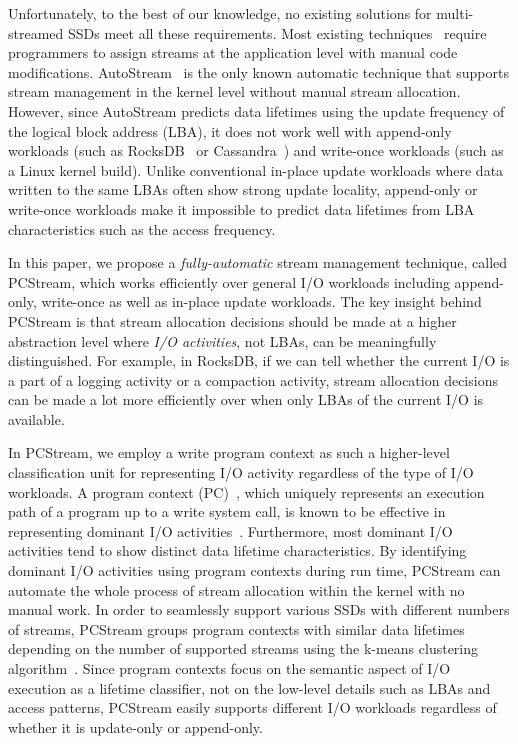 Unfortunately, to the best of our knowledge, no existing solutions  for
multi-streamed SSDs meet all these requirements.  Most existing
techniques~\cite{MultiStream, Level, vStream, FStream} require programmers to
assign streams at the application level with manual code modifications.
\textsf{\small AutoStream}~\cite{AutoStream} is the only known automatic
technique that supports stream management in the kernel level without manual
stream allocation.  However, since \textsf{\small AutoStream} predicts data
lifetimes using the update frequency of the logical block address (LBA), it
does not work well with append-only workloads (such as
RocksDB~\cite{RocksDB} or Cassandra~\cite{Cassandra})
and write-once workloads (such as a Linux kernel build).  Unlike conventional
in-place update workloads where data written to the same LBAs often show strong update
locality, append-only or write-once workloads make it impossible to predict data lifetimes
from LBA characteristics such as the access frequency.

In this paper, we propose a {\it fully-automatic} stream management technique,
called \textsf{\small PCStream}, which works efficiently over general I/O
workloads including append-only, write-once as well as in-place update workloads.   
The key insight behind
\textsf{\small PCStream} is that stream allocation decisions should be made at
a higher abstraction level where {\it I/O activities}, not LBAs, can be
meaningfully distinguished.  For example, in RocksDB, if we can tell whether
the current I/O is a part of a logging activity or a compaction activity, stream
allocation decisions can be made a lot more efficiently over when only LBAs of
the current I/O is available.   

In \textsf{\small PCStream}, we employ a write program context as such a higher-level
classification unit for representing I/O activity regardless of the type of I/O
workloads.  A program context (PC)~\cite{PC, PC2}, which uniquely represents an
execution path of a program up to a write system call, is known to be effective
in representing dominant I/O activities~\cite{PCHa}.  Furthermore, most
dominant I/O activities tend to show distinct data lifetime characteristics.
By identifying dominant I/O activities using program contexts during run time,
\textsf{\small PCStream} can automate the whole process of stream allocation
within the kernel with no manual work.  In order to seamlessly support various
SSDs with different numbers of streams, \textsf{\small PCStream} groups program
contexts with similar data lifetimes depending on the number of supported
streams using the k-means clustering algorithm~\cite{kmeans}.  Since program
contexts focus on the semantic aspect of I/O execution as a lifetime
classifier, not on the low-level details such as LBAs and access patterns,
\textsf{\small PCStream} easily supports different I/O workloads regardless of
whether it is update-only or append-only.   

